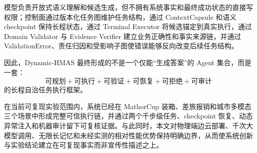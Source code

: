 \documentclass[UTF8,a4paper,12pt,oneside]{ctexbook}
\begin{document}
模型负责开放式语义理解和候选生成，但不拥有系统事实和最终成功状态的直接写权限；控制面通过版本化任务图维护任务结构，通过 ContextCapsule 和语义 checkpoint 保持长程状态，通过 Terminal Executor 将候选锚定到真实执行，通过 Domain Validator 与 Evidence Verifier 建立业务正确性和事实来源链，并通过 ValidationError、责任归因和受影响子图使错误能够反向改变后续任务结构。

因此，Dynamic-HMAS 最终形成的不是一个仅能“生成答案”的 Agent 集合，而是一套：
\[
\boxed{
\text{可规划}
+
\text{可执行}
+
\text{可验证}
+
\text{可恢复}
+
\text{可拒绝}
+
\text{可审计}
}
\]
的长程自治任务执行框架。

在当前可复现实验范围内，系统已经在 MathorCup 装箱、差旅报销和城市多模态三个场景中形成完整可信执行链，并通过两个千步级任务、checkpoint 恢复、动态异常注入和机器审计留下可复核证据。与此同时，本文对物理端边云部署、千次大模型调用、无限长记忆和未经实测的相对性能优势保持明确边界，从而使系统创新与实验结论建立在可复现事实而非宣传性描述之上。
\end{document}

